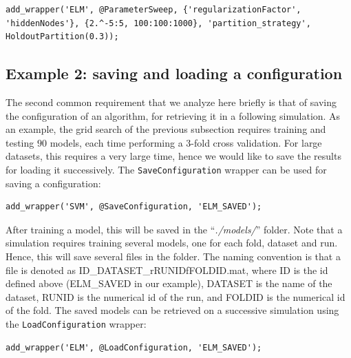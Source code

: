 \begin{lstlisting}
add_wrapper('ELM', @ParameterSweep, {'regularizationFactor', 'hiddenNodes'}, {2.^-5:5, 100:100:1000}, 'partition_strategy', HoldoutPartition(0.3));
\end{lstlisting}

\subsection{Example 2: saving and loading a configuration}

The second common requirement that we analyze here briefly is that of saving the configuration of an algorithm, for retrieving it in a following simulation. As an example, the grid search of the previous subsection requires training and testing $90$ models, each time performing a $3$-fold cross validation. For large datasets, this requires a very large time, hence we would like to save the results for loading it successively. The \verb|SaveConfiguration| wrapper can be used for saving a configuration:

\begin{lstlisting}
add_wrapper('SVM', @SaveConfiguration, 'ELM_SAVED');
\end{lstlisting}

\noindent After training a model, this will be saved in the ``\textit{./models/}'' folder. Note that a simulation requires training several models, one for each fold, dataset and run. Hence, this will save several files in the folder. The naming convention is that a file is denoted as ID\_DATASET\_rRUNIDfFOLDID.mat, where ID is the id defined above (ELM\_SAVED in our example), DATASET is the name of the dataset, RUNID is the numerical id of the run, and FOLDID is the numerical id of the fold. The saved models can be retrieved on a successive simulation using the \verb|LoadConfiguration| wrapper:

\begin{lstlisting}
add_wrapper('ELM', @LoadConfiguration, 'ELM_SAVED');
\end{lstlisting}